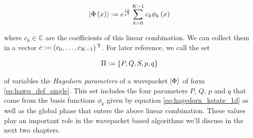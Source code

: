 \begin{equation} \label{eq:hawp_def_single}
  \Ket{\Phi\left( x \right)} := e^{\frac{iS}{\varepsilon^2}} \sum_{k=0}^{K-1} c_k \phi_k \left( x \right)
\end{equation}

where $c_k \in \mathbb{C}$ are the coefficients of this linear combination. We can
collect them in a vector $c := \left(c_0, \ldots, c_{K-1}\right){}^{\textnormal{T}}$. For later
reference, we call the set

\begin{equation} \label{eq:hagedorn_parameters}
  \Pi := \{P, Q, S, p, q\}
\end{equation}

of variables the \emph{Hagedorn parameters} of a wavepacket $\Ket{\Phi}$ of
form \eqref{eq:hawp_def_single}. This set includes the four parameters $P$, $Q$, $p$ and $q$ that come from
the basis functions $\phi_k$ given by equation \eqref{eq:hagedorn_kstate_1d} as
well as the global phase that enters the above linear combination. These values
play an important role in the wavepacket based algorithms we'll discuss in the
next two chapters.

